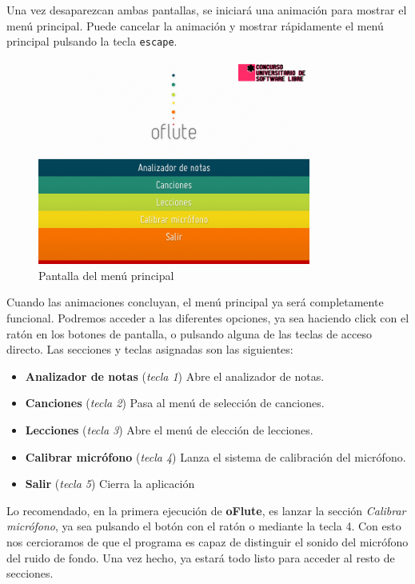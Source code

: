 Una vez desaparezcan ambas pantallas, se iniciará una animación para mostrar el
menú principal. Puede cancelar la animación y mostrar rápidamente el menú
principal pulsando la tecla \texttt{escape}.

\begin{figure}[h!]
  \vspace{-0.1cm}
  \centering
  \includegraphics[width=0.8\textwidth]{apendice_manual_usuario/imagen_menuPrincipal}
  \caption{Pantalla del menú principal}
  \vspace{-1cm}
\end{figure}

Cuando las animaciones concluyan, el menú principal ya será completamente
funcional. Podremos acceder a las diferentes opciones, ya sea haciendo click con
el ratón en los botones de pantalla, o pulsando alguna de las teclas de acceso
directo. Las secciones y teclas asignadas son las siguientes:

\begin{itemize}
\item \textbf{Analizador de notas} (\textit{tecla 1}) Abre el analizador de
  notas.
\item \textbf{Canciones} (\textit{tecla 2}) Pasa al menú de selección de
  canciones.
\item \textbf{Lecciones} (\textit{tecla 3}) Abre el menú de elección de
  lecciones.
\item \textbf{Calibrar micrófono} (\textit{tecla 4}) Lanza el sistema de
  calibración del micrófono.
\item \textbf{Salir} (\textit{tecla 5}) Cierra la aplicación
\end{itemize}

Lo recomendado, en la primera ejecución de \textbf{oFlute}, es lanzar la sección
\textit{Calibrar micrófono}, ya sea pulsando el botón con el ratón o mediante la
tecla 4. Con esto nos cercioramos de que el programa es capaz de distinguir el
sonido del micrófono del ruido de fondo. Una vez hecho, ya estará todo listo
para acceder al resto de secciones.

